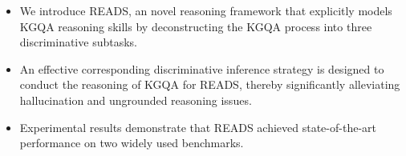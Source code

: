 \documentclass[11pt]{article}
\begin{document}
\begin{itemize}
    \item We introduce READS, an novel reasoning framework that explicitly models KGQA reasoning skills by deconstructing the KGQA process into three discriminative subtasks.
    \item An effective corresponding discriminative inference strategy is designed to conduct the reasoning of KGQA for READS, thereby significantly alleviating hallucination and ungrounded reasoning issues.
    \item Experimental results demonstrate that READS achieved state-of-the-art performance on two widely used benchmarks.
\end{itemize}








\end{document}
